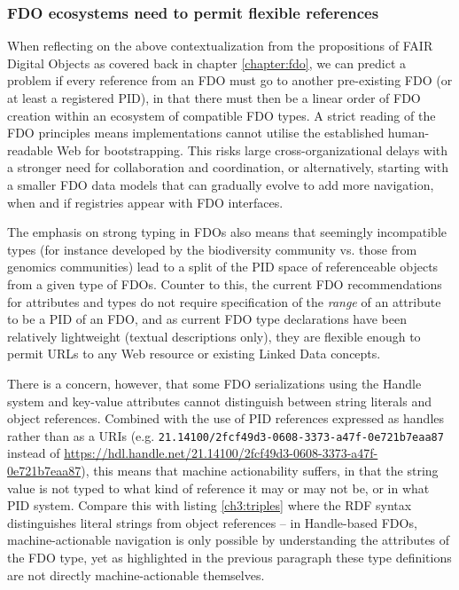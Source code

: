 \subsubsection{FDO ecosystems need to permit flexible references}
\label{ch61:references}

When reflecting on the above contextualization from the propositions of FAIR Digital Objects as covered back in chapter \ref{chapter:fdo}, we can predict a problem if every reference from an FDO must go to another pre-existing FDO (or at least a registered PID), in that there must then be a linear order of FDO creation within an ecosystem of compatible FDO types.
A strict reading of the FDO principles means implementations cannot utilise the established human-readable Web for bootstrapping.
This risks large cross-organizational delays with a stronger need for collaboration and coordination, or alternatively, starting with a smaller FDO data models that can gradually evolve to add more navigation, when and if registries appear with FDO interfaces. 

The emphasis on strong typing in FDOs also means that seemingly incompatible types (for instance developed by the biodiversity community vs. those from genomics communities) lead to a split of the PID space of referenceable objects from a given type of FDOs.  Counter to this, the current FDO recommendations for attributes and types \cite{Blanchi 2023} do not require specification of the \emph{range} of an attribute to be a PID of an FDO, and as current FDO type declarations have been relatively lightweight (textual descriptions only), they are flexible enough to permit URLs to any Web resource or existing Linked Data concepts.  

There is a concern, however, that some FDO serializations using the Handle system and key-value attributes cannot distinguish between string literals and object references.
Combined with the use of PID references expressed as handles rather than as a URIs (e.g. \texttt{21.14100/2fcf49d3-0608-3373-a47f-0e721b7eaa87} instead of \url{https://hdl.handle.net/21.14100/2fcf49d3-0608-3373-a47f-0e721b7eaa87}), this means that machine actionability suffers, in that the string value is not typed to what kind of reference it may or may not be, or in what PID system. Compare this with listing \vref{ch3:triples} where the RDF syntax distinguishes literal strings from object references -- in Handle-based FDOs, machine-actionable navigation is only possible by understanding the attributes of the FDO type, yet as highlighted in the previous paragraph these type definitions are not directly machine-actionable themselves.

